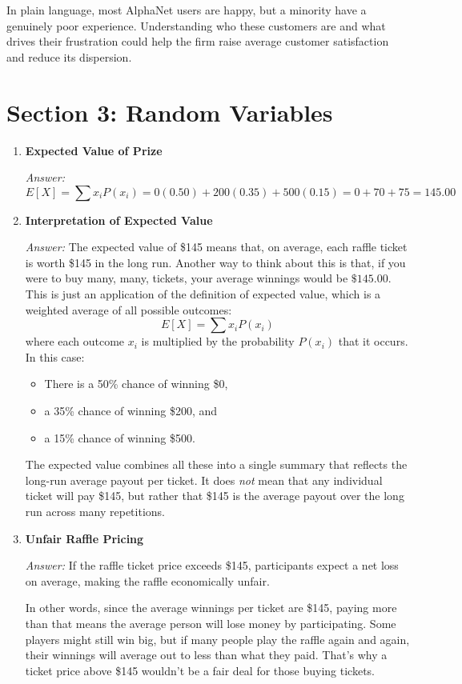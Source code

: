 \documentclass[12pt]{article}
\begin{document}
\begin{enumerate}[label=2.\arabic*]
\begin{itemize}
\end{itemize}
In plain language, most AlphaNet users are happy, but a minority have a genuinely poor experience. Understanding who these customers are and what drives their frustration could help the firm raise average customer satisfaction and reduce its dispersion.


\end{enumerate}

\section*{Section 3: Random Variables}

\begin{enumerate}[label=3.\arabic*]
    \item \textbf{Expected Value of Prize}

    \textit{Answer:}
\[
    E[X] = \sum x_i P(x_i) = 0(0.50) + 200(0.35) + 500(0.15) = 0 + 70 + 75 = \boxed{145.00}
\]

    \item \textbf{Interpretation of Expected Value}

    \textit{Answer:} The expected value of \$145 means that, on average, each raffle ticket is worth \$145 in the long run. Another way to think about this is that, if you were to buy many, many, tickets, your average winnings would be $\$145.00$. \\
    This is just an application of the definition of expected value, which is a weighted average of all possible outcomes:
    \[
        E[X] = \sum x_i P(x_i)
    \]
    where each outcome \(x_i\) is multiplied by the probability \(P(x_i)\) that it occurs. In this case:
    \begin{itemize}
        \item There is a 50\% chance of winning \$0,
        \item a 35\% chance of winning \$200, and
        \item a 15\% chance of winning \$500.
    \end{itemize}
    The expected value combines all these into a single summary that reflects the long-run average payout per ticket. It does \emph{not} mean that any individual ticket will pay \$145, but rather that \$145 is the average payout over the long run across many repetitions.

    \item \textbf{Unfair Raffle Pricing}

    \textit{Answer:} If the raffle ticket price exceeds \$145, participants expect a net loss on average, making the raffle economically unfair.

    In other words, since the average winnings per ticket are \$145, paying more than that means the average person will lose money by participating. Some players might still win big, but if many people play the raffle again and again, their winnings will average out to less than what they paid. That’s why a ticket price above \$145 wouldn’t be a fair deal for those buying tickets.

\end{enumerate}
\end{document}
